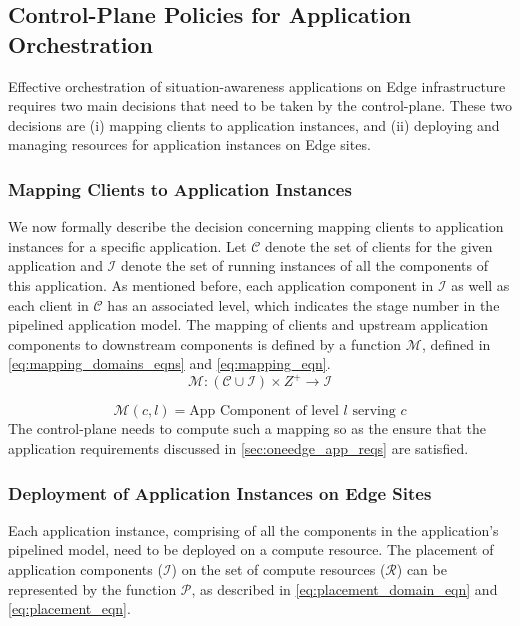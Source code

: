 \subsection{Control-Plane Policies for Application Orchestration}
Effective orchestration of situation-awareness applications on Edge infrastructure requires two main decisions that need to be taken by the control-plane. These two decisions are (i) mapping clients to application instances, and (ii) deploying and managing resources for application instances on Edge sites.

\subsubsection{Mapping Clients to Application Instances}
\newcommand{\clientset}{\mathcal{C}}
\newcommand{\instanceset}{\mathcal{I}}
\newcommand{\resourceset}{\mathcal{R}}

We now formally describe the decision concerning mapping clients to application instances for a specific application. Let $\clientset$ denote the set of clients for the given application and $\instanceset$ denote the set of running instances of all the components of this application. As mentioned before, each application component in $\instanceset$ as well as each client in $\clientset$ has an associated level, which indicates the stage number in the pipelined application model. The mapping of clients and upstream application components to downstream components is defined by a function $\mathcal{M}$, defined in \cref{eq:mapping_domains_eqns} and \cref{eq:mapping_eqn}.
\begin{equation}
\label{eq:mapping_domains_eqns}
\mathcal{M} : \left( \clientset \cup \instanceset \right) \times Z^+ \rightarrow \instanceset
\end{equation}

\begin{equation}
\label{eq:mapping_eqn}
\mathcal{M} \left( c, l \right) = \text{App Component of level }l \text{ serving }c
\end{equation}
The control-plane needs to compute such a mapping so as the ensure that the application requirements discussed in \cref{sec:oneedge_app_reqs} are satisfied.

\subsubsection{Deployment of Application Instances on Edge Sites}
Each application instance, comprising of all the components in the application's pipelined model, need to be deployed on a compute resource. The placement of application components ($\instanceset$) on the set of compute resources ($\resourceset$) can be represented by the function $\mathcal{P}$, as described in \cref{eq:placement_domain_eqn} and \cref{eq:placement_eqn}.

